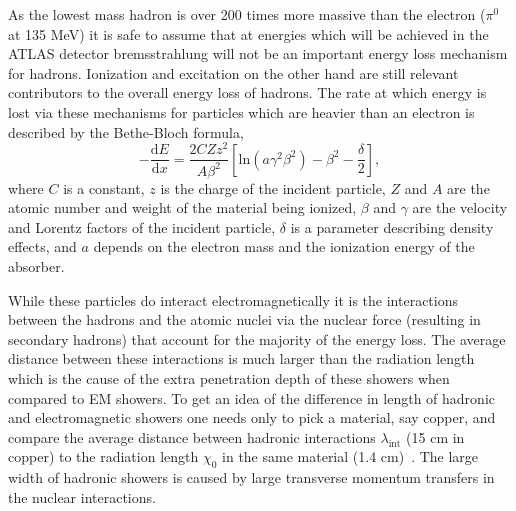 As the lowest mass hadron is over 200 times more massive than the electron ($\pi^{0}$ at 135 MeV) it is safe to assume that at energies which will be achieved in the ATLAS detector bremsstrahlung will not be an important energy loss mechanism for hadrons.  
Ionization and excitation on the other hand are still relevant contributors to the overall energy loss of hadrons.  
The rate at which energy is lost via these mechanisms for particles which are heavier than an electron is described by the Bethe-Bloch formula,  
\begin{equation}
-\frac{\mathrm{d}E}{\mathrm{d}x}=\frac{2CZz^2}{A\beta^2}\left[\mathrm{ln}\left(a\gamma^2\beta^2\right)-\beta^2-\frac{\delta}{2}\right], 
\end{equation}
where $C$ is a constant, $z$ is the charge of the incident particle, $Z$ and $A$ are the atomic number and weight of the material being ionized, $\beta$ and $\gamma$ are the velocity and Lorentz factors of the incident particle, $\delta$ is a parameter describing density effects, and $a$ depends on the electron mass and the ionization energy of the absorber.  

While these particles do interact electromagnetically it is the interactions between the hadrons and the atomic nuclei via the nuclear force (resulting in secondary hadrons) that account for the majority of the energy loss.  
The average distance between these interactions is much larger than the radiation length which is the cause of the extra penetration depth of these showers when compared to EM showers.  
To get an idea of the difference in length of hadronic and electromagnetic showers one needs only to pick a material, say copper, and compare the average distance between hadronic interactions $\lambda_{\mathrm{int}}$ (15 cm in copper) to the radiation length $\chi_{0}$ in the same material (1.4 cm)~\cite{Wigmans2008}.  
The large width of hadronic showers is caused by large transverse momentum transfers in the nuclear interactions.  

